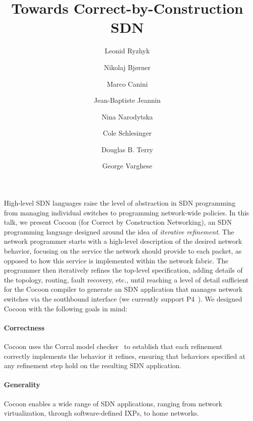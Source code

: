\documentclass[letterpaper,10pt,twocolumn]{article}
\begin{document}
\title{\vspace{-3cm}Towards Correct-by-Construction SDN}

\author[1]{Leonid Ryzhyk}
\author[2]{Nikolaj Bj{\o}rner}
\author[3]{Marco Canini}
\author[1]{Jean-Baptiste Jeannin}
\author[1]{Nina Narodytska}
\author[1]{Cole Schlesinger}
\author[1]{Douglas B. Terry}
\author[2]{George Varghese}


\date{}
\maketitle

High-level SDN languages raise the level of abstraction in SDN 
programming from managing individual switches to programming 
network-wide policies.  In this talk, we present Cocoon (for 
Correct by Construction Networking), an SDN programming language 
designed around the idea of \emph{iterative refinement}.  The 
network programmer starts with a high-level description of the 
desired network behavior, focusing on the service the network 
should provide to each packet, as opposed to how this service is 
implemented within the network fabric.  The programmer then 
iteratively refines the top-level specification, adding details of 
the topology, routing, fault recovery, etc., until reaching a 
level of detail sufficient for the Cocoon compiler to generate an 
SDN application that manages network switches via the southbound 
interface (we currently support P4~\cite{Bosshart_DGIMRSTVVW_14}).  
We designed Cocoon with the following goals in mind:

\paragraph{Correctness} Cocoon uses the Corral model 
checker~\cite{Lal_QL_12} to establish that each refinement 
correctly implements the behavior it refines, ensuring that 
behaviors specified at any refinement step hold on the resulting 
SDN application.


\paragraph{Generality} Cocoon enables a wide range of SDN 
applications, ranging from network virtualization, through 
software-defined IXPs, to home networks. 
\end{document}
